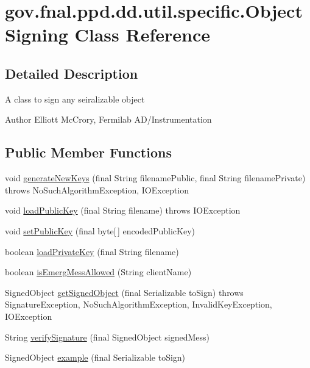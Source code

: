 \hypertarget{classgov_1_1fnal_1_1ppd_1_1dd_1_1util_1_1specific_1_1ObjectSigning}{\section{gov.\-fnal.\-ppd.\-dd.\-util.\-specific.\-Object\-Signing Class Reference}
\label{classgov_1_1fnal_1_1ppd_1_1dd_1_1util_1_1specific_1_1ObjectSigning}
}


\subsection{Detailed Description}
A class to sign any seiralizable object 

\begin{DoxyAuthor}{Author}
Elliott Mc\-Crory, Fermilab A\-D/\-Instrumentation 
\end{DoxyAuthor}
\subsection*{Public Member Functions}
\begin{DoxyCompactItemize}
\item 
void \hyperlink{classgov_1_1fnal_1_1ppd_1_1dd_1_1util_1_1specific_1_1ObjectSigning_af0b44b53a18273c1ac9b2965e62c496e}{generate\-New\-Keys} (final String filename\-Public, final String filename\-Private)  throws No\-Such\-Algorithm\-Exception, I\-O\-Exception 
\item 
void \hyperlink{classgov_1_1fnal_1_1ppd_1_1dd_1_1util_1_1specific_1_1ObjectSigning_adb2220ffd868f2c90669a60e103eabfe}{load\-Public\-Key} (final String filename)  throws I\-O\-Exception 
\item 
void \hyperlink{classgov_1_1fnal_1_1ppd_1_1dd_1_1util_1_1specific_1_1ObjectSigning_a28634898ffa14ba174a785f3a40cb1de}{set\-Public\-Key} (final byte\mbox{[}$\,$\mbox{]} encoded\-Public\-Key)
\item 
boolean \hyperlink{classgov_1_1fnal_1_1ppd_1_1dd_1_1util_1_1specific_1_1ObjectSigning_ad05b0cd592f8f25aa296a80928f31cc7}{load\-Private\-Key} (final String filename)
\item 
boolean \hyperlink{classgov_1_1fnal_1_1ppd_1_1dd_1_1util_1_1specific_1_1ObjectSigning_a561eedb67812a4082d737ec182fe288c}{is\-Emerg\-Mess\-Allowed} (String client\-Name)
\item 
Signed\-Object \hyperlink{classgov_1_1fnal_1_1ppd_1_1dd_1_1util_1_1specific_1_1ObjectSigning_a720162748082c95b69a5b755f0e3cf19}{get\-Signed\-Object} (final Serializable to\-Sign)  throws Signature\-Exception, No\-Such\-Algorithm\-Exception, Invalid\-Key\-Exception, I\-O\-Exception 
\item 
String \hyperlink{classgov_1_1fnal_1_1ppd_1_1dd_1_1util_1_1specific_1_1ObjectSigning_a56dcff2cb63bc6937c100cd76434137a}{verify\-Signature} (final Signed\-Object signed\-Mess)
\item 
Signed\-Object \hyperlink{classgov_1_1fnal_1_1ppd_1_1dd_1_1util_1_1specific_1_1ObjectSigning_a65b93cbc9f0e89beba2add9cd7ad5797}{example} (final Serializable to\-Sign)
\end{DoxyCompactItemize}
